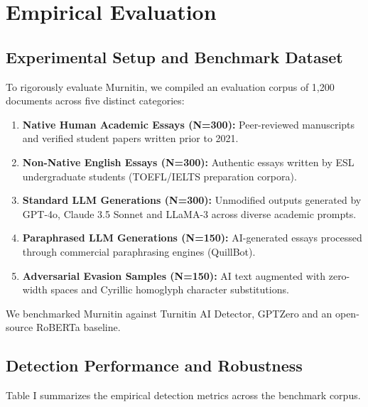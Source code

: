 \documentclass[conference]{IEEEtran}
\begin{document}
\section{Empirical Evaluation}

\subsection{Experimental Setup and Benchmark Dataset}
To rigorously evaluate Murnitin, we compiled an evaluation corpus of 1,200 documents across five distinct categories:
\begin{enumerate}
    \item \textbf{Native Human Academic Essays (N=300):} Peer-reviewed manuscripts and verified student papers written prior to 2021.
    \item \textbf{Non-Native English Essays (N=300):} Authentic essays written by ESL undergraduate students (TOEFL/IELTS preparation corpora).
    \item \textbf{Standard LLM Generations (N=300):} Unmodified outputs generated by GPT-4o, Claude 3.5 Sonnet and LLaMA-3 across diverse academic prompts.
    \item \textbf{Paraphrased LLM Generations (N=150):} AI-generated essays processed through commercial paraphrasing engines (QuillBot).
    \item \textbf{Adversarial Evasion Samples (N=150):} AI text augmented with zero-width spaces and Cyrillic homoglyph character substitutions.
\end{enumerate}

We benchmarked Murnitin against Turnitin AI Detector, GPTZero and an open-source RoBERTa baseline.

\subsection{Detection Performance and Robustness}
Table I summarizes the empirical detection metrics across the benchmark corpus.

\begin{table}[htbp]
\caption{Empirical Performance Comparison Across Detection Systems}
\begin{center}
\label{tab_metrics}
\end{center}
\end{table}
\end{document}
